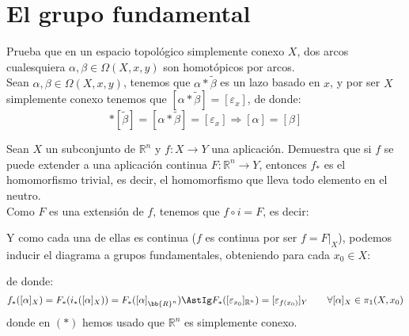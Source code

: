 \section{El grupo fundamental}
\begin{ejercicio}
    Prueba que en un espacio topológico simplemente conexo $X$, dos arcos cualesquiera $\alpha,\beta\in \Omega(X,x,y)$ son homotópicos por arcos.\\

    \noindent
    Sean $\alpha,\beta\in \Omega(X,x,y)$, tenemos que $\alpha\ast\tilde{\beta}$ es un lazo basado en $x$, y por ser $X$ simplemente conexo tenemos que $\left[\alpha\ast\tilde{\beta}\right] = [\varepsilon_x]$, de donde:
    \begin{equation*}
        [\alpha]\ast\left[\tilde{\beta}\right] = \left[\alpha\ast\tilde{\beta}\right] = [\varepsilon_x] \Longrightarrow [\alpha] = [\beta]
    \end{equation*}
\end{ejercicio}

\begin{ejercicio}
    Sean $X$ un subconjunto de $\mathbb{R}^n$ y $f:X\to Y$ una aplicación. Demuestra que si $f$ se puede extender a una aplicación continua $F:\mathbb{R}^n\to Y$, entonces $f_\ast$ es el homomorfismo trivial, es decir, el homomorfismo que lleva todo elemento en el neutro.\\

    \noindent
    Como $F$ es una extensión de $f$, tenemos que $f\circ i = F$, es decir:
    \begin{figure}[H]
        \centering
    \end{figure}
    \noindent
    Y como cada una de ellas es continua ($f$ es continua por ser $f=F\big|_X$), podemos inducir el diagrama a grupos fundamentales, obteniendo para cada $x_0\in X$:
    \begin{figure}[H]
        \centering
    \end{figure}
    de donde:
    \begin{equation*}
        f_\ast([\alpha]_X) = F_\ast(i_\ast([\alpha]_{X})) = F_\ast({[\alpha]}_{\bb{R}^n}) \AstIg F_\ast([\varepsilon_{x_0}]_{\mathbb{R}^n}) = [\varepsilon_{f(x_0)}]_Y \qquad \forall [\alpha]_X \in \pi_1(X,x_0)
    \end{equation*}
    donde en $(\ast)$ hemos usado que $\mathbb{R}^n$ es simplemente conexo.
\end{ejercicio}

